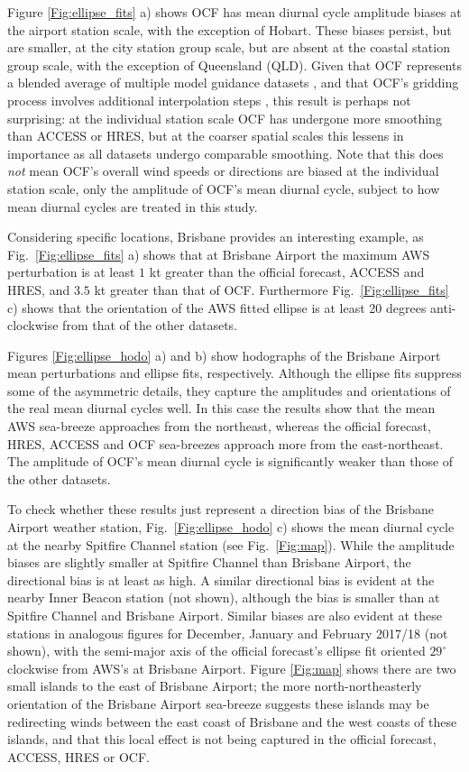 \documentclass{ametsoc}
\begin{document}
Figure \ref{Fig:ellipse_fits} a) shows OCF has mean diurnal cycle amplitude biases at the airport station scale, with the exception of Hobart. These biases persist, but are smaller, at the city station group scale, but are absent at the coastal station group scale, with the exception of  Queensland (QLD). Given that OCF represents a blended average of multiple model guidance datasets \citep{engel07}, and that OCF's gridding process involves additional interpolation steps \citep{bom08, bom12}, this result is perhaps not surprising: at the individual station scale OCF has undergone more smoothing than ACCESS or HRES, but at the coarser spatial scales this lessens in importance as all datasets undergo comparable smoothing. Note that this does \textit{not} mean OCF's overall wind speeds or directions are biased at the individual station scale, only the amplitude of OCF's mean diurnal cycle, subject to how mean diurnal cycles are treated in this study. 

Considering specific locations, Brisbane provides an interesting example, as Fig.~\ref{Fig:ellipse_fits} a) shows that at Brisbane Airport the maximum AWS perturbation is at least $1$ kt greater than the official forecast, ACCESS and HRES, and $3.5$ kt greater than that of OCF. Furthermore Fig.~\ref{Fig:ellipse_fits} c) shows that the orientation of the AWS fitted ellipse is at least 20 degrees anti-clockwise from that of the other datasets. 

Figures \ref{Fig:ellipse_hodo} a) and b) show hodographs of the Brisbane Airport mean perturbations and ellipse fits, respectively. Although the ellipse fits suppress some of the asymmetric details, they capture the amplitudes and orientations of the real mean diurnal cycles well. In this case the results show that the mean AWS sea-breeze approaches from the northeast, whereas the official forecast, HRES, ACCESS and OCF sea-breezes approach more from the east-northeast. The amplitude of OCF's mean diurnal cycle is significantly weaker than those of the other datasets.

To check whether these results just represent a direction bias of the Brisbane Airport weather station, Fig.~\ref{Fig:ellipse_hodo} c) shows the mean diurnal cycle at the nearby Spitfire Channel station (see Fig.~\ref{Fig:map}). While the amplitude biases are slightly smaller at Spitfire Channel than Brisbane Airport, the directional bias is at least as high. A similar directional bias is evident at the nearby Inner Beacon station (not shown), although the bias is smaller than at Spitfire Channel and Brisbane Airport. Similar biases are also evident at these stations in analogous figures for December, January and February 2017/18 (not shown), with the semi-major axis of the official forecast's ellipse fit oriented $29^\circ$ clockwise from AWS's at Brisbane Airport. Figure \ref{Fig:map} shows there are two small islands to the east of Brisbane Airport; the more north-northeasterly orientation of the Brisbane Airport sea-breeze suggests these islands may be redirecting winds between the east coast of Brisbane and the west coasts of these islands, and that this local effect is not being captured in the official forecast, ACCESS, HRES or OCF.  
\end{document}
